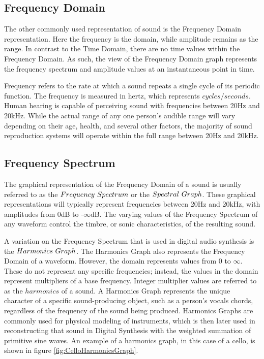 \documentclass[a4paper,12pt]{report}
\begin{document}
\subsection{Frequency Domain}
\label{subsec:freqdomain}
The other commonly used representation of sound is the Frequency Domain representation. Here the frequency is the domain, while amplitude remains as the range. In contrast to the Time Domain, there are no time values within the Frequency Domain. As such, the view of the Frequency Domain graph represents the frequency spectrum and amplitude values at an instantaneous point in time.

Frequency refers to the rate at which a sound repeats a single cycle of its periodic function. The frequency is measured in hertz, which represents $cycles/seconds$. Human hearing is capable of perceiving sound with frequencies between 20Hz and 20kHz. While the actual range of any one person's audible range will vary depending on their age, health, and several other factors, the majority of sound reproduction systems will operate within the full range between 20Hz and 20kHz. 

\subsection{Frequency Spectrum}
\label{subsec:freqspect}
The graphical representation of the Frequency Domain of a sound is usually referred to as the $Frequency\ \-Spectrum$ or the $Spectral\ \-Graph$. These graphical representations will typically represent frequencies between 20Hz and 20kHz, with amplitudes from 0dB to -$\infty$dB. The varying values of the Frequency Spectrum of any waveform control the timbre, or sonic characteristics, of the resulting sound.

A variation on the Frequency Spectrum that is used in digital audio synthesis is the $Harmonics\ \-Graph$. The Harmonics Graph also represents the Frequency Domain of a waveform. However, the domain represents values from 0 to $\infty$. These do not represent any specific frequencies; instead, the values in the domain represent multipliers of a base frequency. Integer multiplier values are referred to as the $harmonics$ of a sound. A Harmonics Graph represents the unique character of a specific sound-producing object, such as a person's vocals chords, regardless of the frequency of the sound being produced. Harmonics Graphs are commonly used for physical modeling of instruments, which is then later used in reconstructing that sound in Digital Synthesis with the weighted summation of primitive sine waves. An example of a harmonics graph, in this case of a cello, is shown in figure \ref{fig:CelloHarmonicsGraph}.
\end{document}
